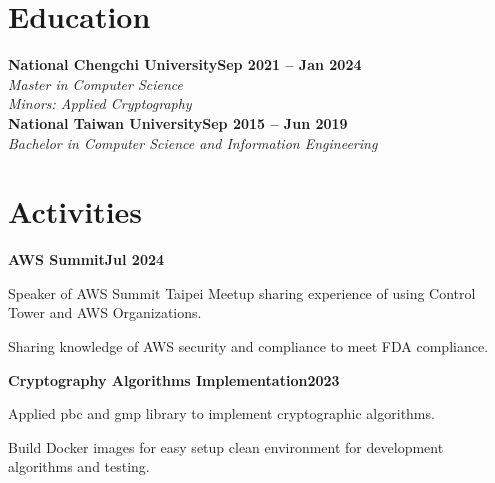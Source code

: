 \documentclass[letterpaper,10pt]{article}
\newcommand{\heading}[2]{
  \hspace{10pt}#1\hfill#2\\
}
\newcommand{\headingBf}[2]{
  \heading{\textbf{#1}}{\textbf{#2}}
}
\newcommand{\headingIt}[2]{
  \heading{\textit{#1}}{\textit{#2}}
}
\newenvironment{resume_list}{
  \vspace{-7pt}
  \begin{itemize}[itemsep=-2px, parsep=1pt, leftmargin=30pt]
}{
  \end{itemize}
}
\begin{document}

  \section{Education}

  \headingBf{National Chengchi University}{Sep 2021 -- Jan 2024} %
  \headingIt{Master in Computer Science}{}
  \headingIt{Minors: Applied Cryptography}{}

  \headingBf{National Taiwan University}{Sep 2015 -- Jun 2019} %
  \headingIt{Bachelor in Computer Science and Information Engineering}{}


  \section{Activities}

  \headingBf{AWS Summit}{Jul 2024}
  \begin{resume_list}
	\item Speaker of AWS Summit Taipei Meetup sharing experience of using Control Tower and AWS Organizations.
	\item Sharing knowledge of AWS security and compliance to meet FDA compliance.
  \end{resume_list}

  \headingBf{Cryptography Algorithms Implementation}{2023}
  \begin{resume_list}
	\item Applied pbc and gmp library to implement cryptographic algorithms.
	\item Build Docker images for easy setup clean environment for development algorithms and testing.
  \end{resume_list}
\end{document}
